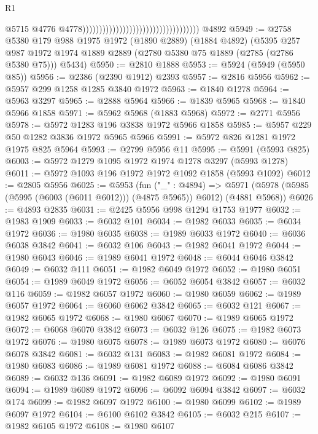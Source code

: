 \begin{lexlean}{R1}
\begin{coremodule}
                                                                          @5715
                                                                          @4776
                                                                          @4778)))))))))))))))))))))))))))))))))))
    @4892
@5949 := @2758
    @5380
    @179
    @988
    @1975
    @1972
    (@1890 @2889)
    (@1884 @4892)
    (@5395
      @257
      @987
      @1972
      @1974
      @1889
      @2889
      (@2780 @5380 @75 @1889 (@2785 (@2786 @5380 @75)))
      @5434)
@5950 := @2810 @1888
@5953 := @5924 (@5949 (@5950 @85))
@5956 := @2386 (@2390 @1912) @2393
@5957 := @2816 @5956
@5962 := @5957 @299 @1258 @1285 @3840 @1972
@5963 := @1840 @1278
@5964 := @5963 @3297
@5965 := @2888 @5964
@5966 := @1839 @5965
@5968 := @1840 @5966 @1858
@5971 := @5962 @5968 (@1883 @5968)
@5972 := @2771 @5956
@5978 := @5972 @1283 @196 @3838 @1972 @5966 @1858
@5985 := @5957 @229 @50 @1282 @3836 @1972 @5965 @5966
@5991 := @5972 @826 @1281 @1972 @1975 @825 @5964
@5993 := @2799 @5956 @11
@5995 := @5991 (@5993 @825)
@6003 := @5972 @1279 @1095 @1972 @1974 @1278 @3297 (@5993 @1278)
@6011 := @5972 @1093 @196 @1972 @1972 @1092 @1858 (@5993 @1092)
@6012 := @2805 @5956
@6025 := @5953
    (fun ("_" : @4894) =>
    @5971 (@5978 (@5985 (@5995 (@6003 (@6011 @6012))) (@4875 @5965)) @6012) (@4881 @5968))
@6026 := @4893 @2835
@6031 := @2425 @5956 @998 @1294 @1753 @1977
@6032 := @1983 @1909
@6033 := @6032 @101
@6034 := @1982 @6033
@6035 := @6034 @1972
@6036 := @1980 @6035
@6038 := @1989 @6033 @1972
@6040 := @6036 @6038 @3842
@6041 := @6032 @106
@6043 := @1982 @6041 @1972
@6044 := @1980 @6043
@6046 := @1989 @6041 @1972
@6048 := @6044 @6046 @3842
@6049 := @6032 @111
@6051 := @1982 @6049 @1972
@6052 := @1980 @6051
@6054 := @1989 @6049 @1972
@6056 := @6052 @6054 @3842
@6057 := @6032 @116
@6059 := @1982 @6057 @1972
@6060 := @1980 @6059
@6062 := @1989 @6057 @1972
@6064 := @6060 @6062 @3842
@6065 := @6032 @121
@6067 := @1982 @6065 @1972
@6068 := @1980 @6067
@6070 := @1989 @6065 @1972
@6072 := @6068 @6070 @3842
@6073 := @6032 @126
@6075 := @1982 @6073 @1972
@6076 := @1980 @6075
@6078 := @1989 @6073 @1972
@6080 := @6076 @6078 @3842
@6081 := @6032 @131
@6083 := @1982 @6081 @1972
@6084 := @1980 @6083
@6086 := @1989 @6081 @1972
@6088 := @6084 @6086 @3842
@6089 := @6032 @136
@6091 := @1982 @6089 @1972
@6092 := @1980 @6091
@6094 := @1989 @6089 @1972
@6096 := @6092 @6094 @3842
@6097 := @6032 @174
@6099 := @1982 @6097 @1972
@6100 := @1980 @6099
@6102 := @1989 @6097 @1972
@6104 := @6100 @6102 @3842
@6105 := @6032 @215
@6107 := @1982 @6105 @1972
@6108 := @1980 @6107

\end{coremodule}
\end{lexlean}
